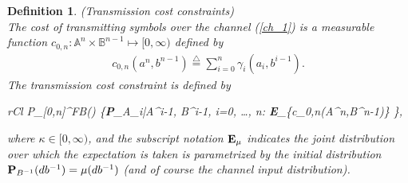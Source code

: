 \documentclass[11pt, a4paper, journal,onecolumn]{IEEEtran}
\newcommand{\mb}{\mathbb}
\newcommand{\sr}{\stackrel}
\newcommand{\tri}{\sr{\triangle}{=}}
\newcommand{\bea}{\begin{eqnarray}}
\newcommand{\eea}{\end{eqnarray}}
\newcommand{\beae}{\begin{IEEEeqnarray}{rCl}}
\newcommand{\eeae}{\end{IEEEeqnarray}}
\newcommand{\nms}{\IEEEeqnarraynumspace}
\newcommand{\hso}{\hspace{.1in}}
\newtheorem{definition}{Definition}[section]
\begin{document}
\begin{definition}(Transmission cost constraints)\label{def:umco_cc}\\
The cost of transmitting symbols over the channel (\ref{ch_1})  is 
 a measurable function $c_{0,n}:{\mb A}^{n}\times{\mb B}^{n-1}\longmapsto [0,\infty)$  defined by 
\bea
c_{0,n}(a^n,b^{n-1})\tri\sum_{i=0}^{n}{\gamma}_{i}(a_i,b^{i-1}).
\eea
The transmission cost  constraint is  defined by 
\beae
{\cal P}_{[0,n]}^{FB}(\kappa) {\tri} \Big\{{\bf P}_{A_i|A^{i-1}, B^{i-1}}, i=0, \ldots, n:  {} {\bf E}_\mu \big\{c_{0,n}(A^n,B^{n{-}1})\big\} \leq \kappa\Big\}, \hso \kappa\in[0,\infty]\nms
\eeae
where $\kappa \in [0, \infty)$, and the subscript notation ${\bf E}_\mu$ indicates the joint distribution over which the expectation is taken is parametrized by the  initial distribution   ${\bf P}_{B^{-1}}(d{b}^{-1})=\mu(db^{-1})$ (and of course the channel input distribution).\\
\end{definition}
\end{document}
